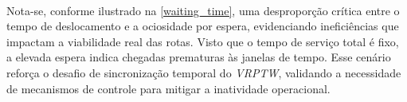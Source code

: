 \paragraph{} Nota-se, conforme ilustrado na \autoref{waiting_time}, uma desproporção crítica entre o tempo de deslocamento e a ociosidade por espera, evidenciando ineficiências que impactam a viabilidade real das rotas. Visto que o tempo de serviço total é fixo, a elevada espera indica chegadas prematuras às janelas de tempo. Esse cenário reforça o desafio de sincronização temporal do \textit{VRPTW}, validando a necessidade de mecanismos de controle para mitigar a inatividade operacional.

